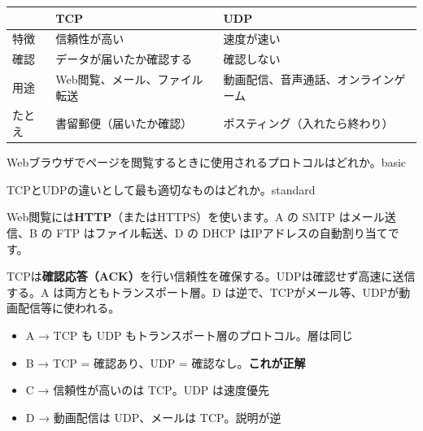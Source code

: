 \begin{comparison}
\begin{tabularx}{\textwidth}{lXX}
  \toprule
  & \textbf{TCP} & \textbf{UDP} \\
  \midrule
  特徴 & 信頼性が高い & 速度が速い \\
  確認 & データが届いたか確認する & 確認しない \\
  用途 & Web閲覧、メール、ファイル転送 & 動画配信、音声通話、オンラインゲーム \\
  たとえ & 書留郵便（届いたか確認） & ポスティング（入れたら終わり） \\
  \bottomrule
\end{tabularx}
\end{comparison}


\begin{mondai}{Webブラウザでページを閲覧するときに使用されるプロトコルはどれか。}{basic}
\end{mondai}

\begin{mondai}{TCPとUDPの違いとして最も適切なものはどれか。}{standard}
\end{mondai}

\kaitoupage


\begin{kaisetsu}
Web閲覧には\textbf{HTTP}（またはHTTPS）を使います。A の SMTP はメール送信、B の FTP はファイル転送、D の DHCP はIPアドレスの自動割り当てです。
\end{kaisetsu}


\begin{kaisetsu}
TCPは\textbf{確認応答（ACK）}を行い信頼性を確保する。UDPは確認せず高速に送信する。A は両方ともトランスポート層。D は逆で、TCPがメール等、UDPが動画配信等に使われる。
\end{kaisetsu}

\begin{goutoubun}
\begin{itemize}
  \item A → TCP も UDP もトランスポート層のプロトコル。層は同じ
  \item B → TCP = 確認あり、UDP = 確認なし。\textbf{これが正解}
  \item C → 信頼性が高いのは TCP。UDP は速度優先
  \item D → 動画配信は UDP、メールは TCP。説明が逆
\end{itemize}
\end{goutoubun}


